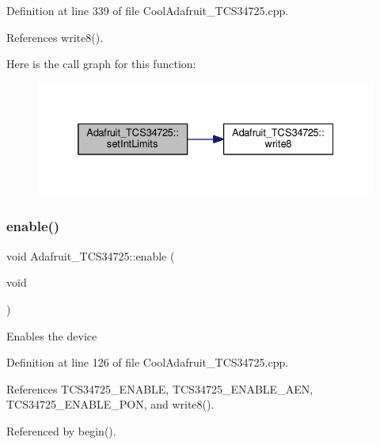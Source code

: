 Definition at line 339 of file Cool\+Adafruit\+\_\+\+T\+C\+S34725.\+cpp.



References write8().

Here is the call graph for this function\+:
\nopagebreak
\begin{figure}[H]
\begin{center}
\leavevmode
\includegraphics[width=332pt]{df/d54/class_adafruit___t_c_s34725_ac17b2447df066e30d1e64fe764f88770_cgraph}
\end{center}
\end{figure}
\mbox{\label{class_adafruit___t_c_s34725_ad9a0e1f4f77d32dc0a6d604f7d1d5586}} 
\subsubsection{\texorpdfstring{enable()}{enable()}}
{\footnotesize\ttfamily void Adafruit\+\_\+\+T\+C\+S34725\+::enable (\begin{DoxyParamCaption}\item[{void}]{ }\end{DoxyParamCaption})}

Enables the device 

Definition at line 126 of file Cool\+Adafruit\+\_\+\+T\+C\+S34725.\+cpp.



References T\+C\+S34725\+\_\+\+E\+N\+A\+B\+LE, T\+C\+S34725\+\_\+\+E\+N\+A\+B\+L\+E\+\_\+\+A\+EN, T\+C\+S34725\+\_\+\+E\+N\+A\+B\+L\+E\+\_\+\+P\+ON, and write8().



Referenced by begin().

